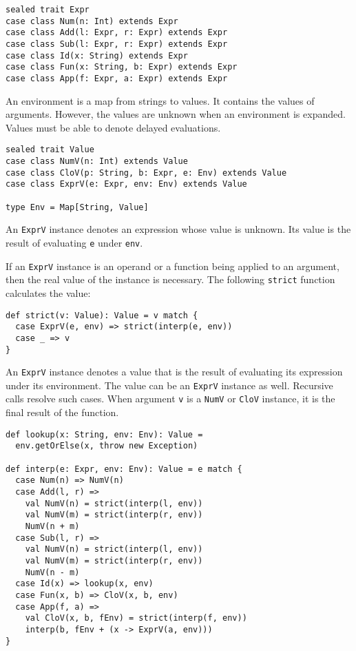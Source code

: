 \begin{verbatim}
sealed trait Expr
case class Num(n: Int) extends Expr
case class Add(l: Expr, r: Expr) extends Expr
case class Sub(l: Expr, r: Expr) extends Expr
case class Id(x: String) extends Expr
case class Fun(x: String, b: Expr) extends Expr
case class App(f: Expr, a: Expr) extends Expr
\end{verbatim}

An environment is a map from strings to values. It contains the values of
arguments. However, the values are unknown when an environment is expanded.
Values must be able to denote delayed evaluations.

\begin{verbatim}
sealed trait Value
case class NumV(n: Int) extends Value
case class CloV(p: String, b: Expr, e: Env) extends Value
case class ExprV(e: Expr, env: Env) extends Value

type Env = Map[String, Value]
\end{verbatim}

An \verb!ExprV! instance denotes an expression whose value is unknown. Its value
is the result of evaluating \verb!e! under \verb!env!.

If an \verb!ExprV! instance is an operand or a function being applied to an
argument, then the real value of the instance is necessary. The following
\verb!strict! function calculates the value:

\begin{verbatim}
def strict(v: Value): Value = v match {
  case ExprV(e, env) => strict(interp(e, env))
  case _ => v
}
\end{verbatim}

An \verb!ExprV! instance denotes a value that is the result of evaluating its
expression under its environment. The value can be an \verb!ExprV! instance as
well. Recursive calls resolve such cases. When argument \verb!v! is a \verb!NumV!
or \verb!CloV! instance, it is the final result of the function.


\begin{verbatim}
def lookup(x: String, env: Env): Value =
  env.getOrElse(x, throw new Exception)

def interp(e: Expr, env: Env): Value = e match {
  case Num(n) => NumV(n)
  case Add(l, r) =>
    val NumV(n) = strict(interp(l, env))
    val NumV(m) = strict(interp(r, env))
    NumV(n + m)
  case Sub(l, r) =>
    val NumV(n) = strict(interp(l, env))
    val NumV(m) = strict(interp(r, env))
    NumV(n - m)
  case Id(x) => lookup(x, env)
  case Fun(x, b) => CloV(x, b, env)
  case App(f, a) =>
    val CloV(x, b, fEnv) = strict(interp(f, env))
    interp(b, fEnv + (x -> ExprV(a, env)))
}
\end{verbatim}

